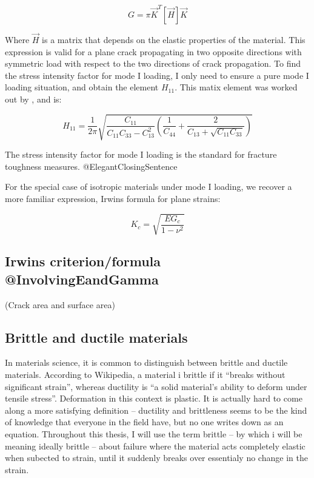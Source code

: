 \begin{equation}
	G = \pi \vec{K}^T [\vec{H}] \vec{K} 
\end{equation}

Where $\vec{H}$ is a matrix that depends on the elastic properties of the material. This expression is valid for a plane crack propagating in two opposite directions with symmetric load with respect to the two directions of crack propagation.
To find the stress intensity factor for mode I loading, I only need to ensure a pure mode I loading situation, and obtain the element $H_{11}$. This matix element was worked out by \cite{Laubie2014}, and is:

\begin{equation}
	H_{11} = \frac{1}{2\pi} \sqrt{\frac{C_{11}}{C_{11}C_{33}-C^2_{13}}\left( \frac{1}{C_{44}} + \frac{2}{C_{13} + \sqrt{C_{11} C_{33}}}\right)}
\end{equation}

The stress intensity factor for mode I loading is the standard for fracture toughness measures. @ElegantClosingSentence

For the special case of isotropic materials under mode I loading, we recover a more familiar expression, Irwins formula for plane strains:

\begin{equation}
	K_c = \sqrt{\frac{EG_c}{1-\nu^2}}
\end{equation}

\subsection{Irwins criterion/formula @InvolvingEandGamma }
(Crack area and surface area)

\subsection{Brittle and ductile materials}
In materials science, it is common to distinguish between brittle and ductile materials. According to Wikipedia, a material i brittle if it ``breaks without significant strain'', whereas ductility is ``a solid material's ability to deform under tensile stress''. Deformation in this context is plastic. It is actually hard to come along a more satisfying definition -- ductility and brittleness seems to be the kind of knowledge that everyone in the field have, but no one writes down as an equation. Throughout this thesis, I will use the term brittle -- by which i will be meaning ideally brittle -- about failure where the material acts completely elastic when subected to strain, until it suddenly breaks over essentialy no change in the strain.

